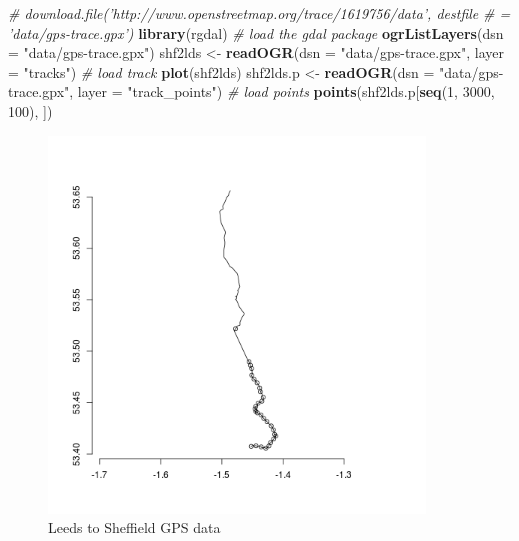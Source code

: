 \documentclass[]{article}
\newenvironment{Shaded}{}{}
\newcommand{\KeywordTok}[1]{\textcolor[rgb]{0.00,0.44,0.13}{\textbf{{#1}}}}
\newcommand{\DataTypeTok}[1]{\textcolor[rgb]{0.56,0.13,0.00}{{#1}}}
\newcommand{\DecValTok}[1]{\textcolor[rgb]{0.25,0.63,0.44}{{#1}}}
\newcommand{\StringTok}[1]{\textcolor[rgb]{0.25,0.44,0.63}{{#1}}}
\newcommand{\CommentTok}[1]{\textcolor[rgb]{0.38,0.63,0.69}{\textit{{#1}}}}
\newcommand{\NormalTok}[1]{{#1}}
\let\Oldincludegraphics\includegraphics
\renewcommand{\includegraphics}[1]{\Oldincludegraphics[width=10cm]{#1}}
\begin{document}
\begin{Shaded}
\begin{Highlighting}[]
\CommentTok{# download.file('http://www.openstreetmap.org/trace/1619756/data', destfile}
\CommentTok{# = 'data/gps-trace.gpx')}
\KeywordTok{library}\NormalTok{(rgdal)  }\CommentTok{# load the gdal package}
\KeywordTok{ogrListLayers}\NormalTok{(}\DataTypeTok{dsn =} \StringTok{"data/gps-trace.gpx"}\NormalTok{)}
\NormalTok{shf2lds <- }\KeywordTok{readOGR}\NormalTok{(}\DataTypeTok{dsn =} \StringTok{"data/gps-trace.gpx"}\NormalTok{, }\DataTypeTok{layer =} \StringTok{"tracks"}\NormalTok{)  }\CommentTok{# load track}
\KeywordTok{plot}\NormalTok{(shf2lds)}
\NormalTok{shf2lds.p <- }\KeywordTok{readOGR}\NormalTok{(}\DataTypeTok{dsn =} \StringTok{"data/gps-trace.gpx"}\NormalTok{, }\DataTypeTok{layer =} \StringTok{"track_points"}\NormalTok{)  }\CommentTok{# load points}
\KeywordTok{points}\NormalTok{(shf2lds.p[}\KeywordTok{seq}\NormalTok{(}\DecValTok{1}\NormalTok{, }\DecValTok{3000}\NormalTok{, }\DecValTok{100}\NormalTok{), ])}
\end{Highlighting}
\end{Shaded}
\begin{figure}[htbp]
\centering
\includegraphics{figure/Leeds_to_Sheffield_GPS_data.png}
\caption{Leeds to Sheffield GPS data}
\end{figure}
\end{document}
